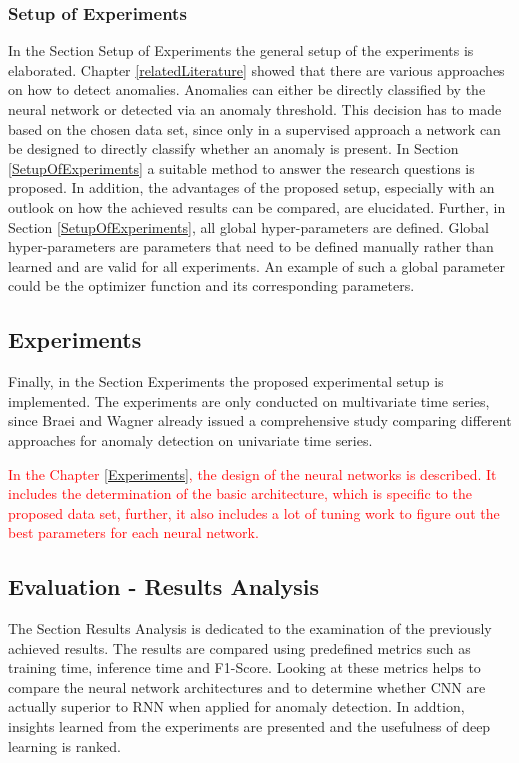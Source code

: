 \subsubsection{Setup of Experiments}
In the Section Setup of Experiments the general setup of the experiments is elaborated. Chapter \ref{relatedLiterature} showed that there are various approaches on how to detect anomalies. Anomalies can either be directly classified by the neural network or detected via an anomaly threshold. This decision has to made based on the chosen data set, since only in a supervised approach a network can be designed to directly classify whether an anomaly is present. In Section \ref{SetupOfExperiments} a suitable method to answer the research questions is proposed. In addition, the advantages of the proposed setup, especially with an outlook on how the achieved results can be compared, are elucidated.   
Further, in Section \ref{SetupOfExperiments}, all global hyper-parameters are defined. Global hyper-parameters are parameters that need to be defined manually rather than learned and are valid for all experiments. An example of such a global parameter could be the optimizer function and its corresponding parameters.

\subsection{Experiments}
Finally, in the Section Experiments the proposed experimental setup is implemented. The experiments are only conducted on multivariate time series, since Braei and Wagner \parencite*{Braei2020} already issued a comprehensive study comparing different approaches for anomaly detection on univariate time series. 

\textcolor{red}{In the Chapter \ref{Experiments}, the design of the neural networks is described. It includes the determination of the basic architecture, which is specific to the proposed data set, further, it also includes a lot of tuning work to figure out the best parameters for each neural network. }


\subsection{Evaluation - Results Analysis}
The Section Results Analysis is dedicated to the examination of the previously achieved results. The results are compared using predefined metrics such as training time, inference time and F1-Score. Looking at these metrics helps to compare the neural network architectures and to determine whether CNN are actually superior to RNN when applied for anomaly detection. In addtion, insights learned from the experiments are presented and the usefulness of deep learning is ranked.

